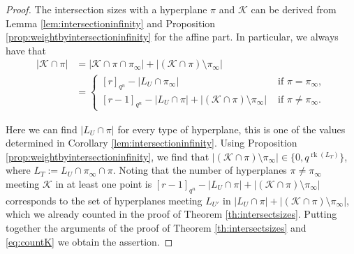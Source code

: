 \documentclass[11pt]{amsart}
\DeclareMathOperator{\rk}{rk}
\newcommand{\F}{{\mathbb F}}
\newcommand{\PG}{\mathrm{PG}}
\begin{document}
\begin{proof}
The intersection sizes with a hyperplane $\pi$ and $\mathcal{K}$ can be derived from Lemma \ref{lem:intersectioninfinity} and Proposition \ref{prop:weightbyintersectioninfinity} for the affine part. In particular, we always have that
\begin{equation}\label{eq:countK}
    \begin{split}
        \lvert \mathcal{K} \cap \pi \rvert &= \lvert \mathcal{K} \cap \pi \cap \pi_\infty \rvert +\lvert (\mathcal{K} \cap \pi)\setminus \pi_\infty  \rvert\\
        &=
        \begin{cases}
        [r]_{q^n}-|L_U \cap \pi_{\infty}| & \mbox{ if } \pi=\pi_{\infty},\\
        [r-1]_{q^n}-|L_U \cap \pi|+\lvert (\mathcal{K} \cap \pi)\setminus \pi_\infty \rvert & \mbox{ if } \pi \neq \pi_{\infty}.
        \end{cases}
    \end{split}
\end{equation}

Here we can find $\lvert L_U \cap \pi\rvert$ for every type of hyperplane, this is one of the values determined in Corollary \ref{lem:intersectioninfinity}.
Using Proposition \ref{prop:weightbyintersectioninfinity}, we find that $\lvert (\mathcal{K} \cap \pi)\setminus \pi_\infty  \rvert\in \{0,q^{\rk(L_T)}\}$, where $L_T:=L_U \cap \pi_{\infty}\cap \pi$. 
Noting that the number of hyperplanes $\pi\ne\pi_{\infty}$ meeting $\mathcal{K}$ in at least one point is $[r-1]_{q^n}-|L_U \cap \pi|+\lvert (\mathcal{K} \cap \pi)\setminus \pi_\infty \rvert$ corresponds to the set of hyperplanes meeting $L_{U'}$ in $|L_U \cap \pi|+\lvert (\mathcal{K} \cap \pi)\setminus \pi_\infty \rvert$, which we already counted in the proof of Theorem \ref{th:intersectsizes}. Putting together the arguments of the proof of Theorem \ref{th:intersectsizes} and \eqref{eq:countK} we obtain the assertion.


\end{proof}
\end{document}
